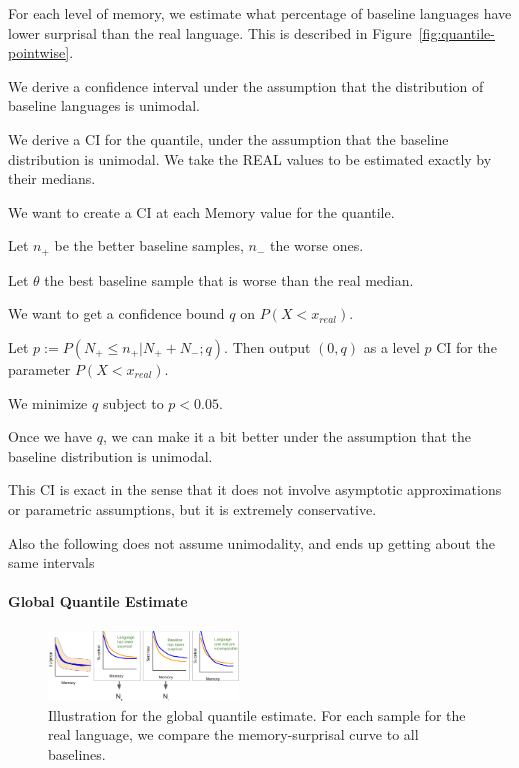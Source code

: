 \documentclass[11pt,letterpaper]{article}
\begin{document}
For each level of memory, we estimate what percentage of baseline languages have lower surprisal than the real language.
This is described in Figure~\ref{fig:quantile-pointwise}.

We derive a confidence interval under the assumption that the distribution of baseline languages is unimodal.

We derive a CI for the quantile, under the assumption that the baseline distribution is unimodal. We take the REAL values to be estimated exactly by their medians.

We want to create a CI at each Memory value for the quantile.

Let $n_+$ be the better baseline samples, $n_-$ the worse ones.

Let $\theta$ the best baseline sample that is worse than the real median.

We want to get a confidence bound $q$ on $P(X < x_{real})$.

Let $p := P(N_+ \leq n_+ | N_+ + N_-; q)$.
Then output $(0, q)$ as a level $p$ CI for the parameter $P(X < x_{real})$.

We minimize $q$ subject to $p < 0.05$.

Once we have $q$, we can make it a bit better under the assumption that the baseline distribution is unimodal.

This CI is exact in the sense that it does not involve asymptotic approximations or parametric assumptions, but it is extremely conservative.

Also the following does not assume unimodality, and ends up getting about the same intervals




\paragraph{Global Quantile Estimate}


\begin{figure}
	\begin{center}
\includegraphics[width=0.45\textwidth]{figures/quantile-global.png}
\end{center}
	\caption{Illustration for the global quantile estimate. For each sample for the real language, we compare the memory-surprisal curve to all baselines.}\label{fig:quantile-global}
\end{figure}
\end{document}
